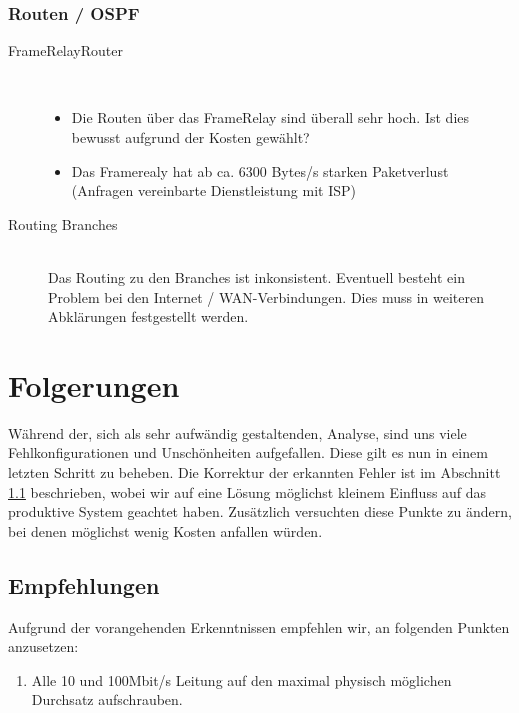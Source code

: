 \subsubsection{Routen / OSPF}

\begin{description}
	\item[FrameRelayRouter] \hfill \\
		\begin{itemize}
			\item Die Routen über das FrameRelay sind überall sehr hoch. Ist dies bewusst aufgrund der Kosten gewählt?
			\item Das Framerealy hat ab ca. 6300 Bytes/s starken Paketverlust (Anfragen vereinbarte Dienstleistung mit ISP)
		\end{itemize}
	\item[Routing Branches] \hfill \\
		Das Routing zu den Branches ist inkonsistent. Eventuell besteht ein Problem bei den Internet / WAN-Verbindungen. Dies muss in weiteren Abklärungen festgestellt werden.
\end{description}

\section{Folgerungen}
Während der, sich als sehr aufwändig gestaltenden, Analyse, sind uns viele Fehlkonfigurationen und Unschönheiten aufgefallen. Diese gilt es nun in einem letzten Schritt zu beheben. Die Korrektur der erkannten Fehler ist im Abschnitt \ref{sec:recommedations} beschrieben, wobei wir auf eine Lösung möglichst kleinem Einfluss auf das produktive System geachtet haben. Zusätzlich versuchten diese Punkte zu ändern, bei denen möglichst wenig Kosten anfallen würden.

\subsection{Empfehlungen}
\label{sec:recommedations}
Aufgrund der vorangehenden Erkenntnissen empfehlen wir, an folgenden Punkten anzusetzen:
\begin{enumerate}
	\item Alle 10 und 100Mbit/s Leitung auf den maximal physisch möglichen Durchsatz aufschrauben.
\end{enumerate}

